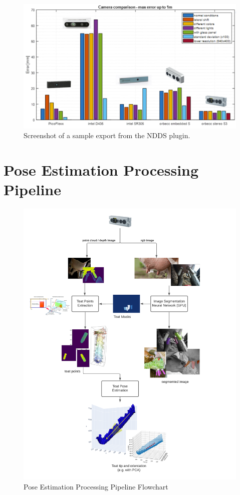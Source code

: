 \begin{figure}[!ht]
    \centering
    \includegraphics[width=1\textwidth]{images/camera_choice.png}
    \caption{Screenshot of a sample export from the NDDS plugin.}
    \label{fig:ndds}
\end{figure}

\newpage
\section{Pose Estimation Processing Pipeline}
\label{appendix:cow_design}
\begin{figure}[!ht]
    \centering
    \includegraphics[width=1\textwidth]{images/cow_design.png}
    \caption{Pose Estimation Processing Pipeline Flowchart}
    \label{fig:cow_design}
\end{figure}

